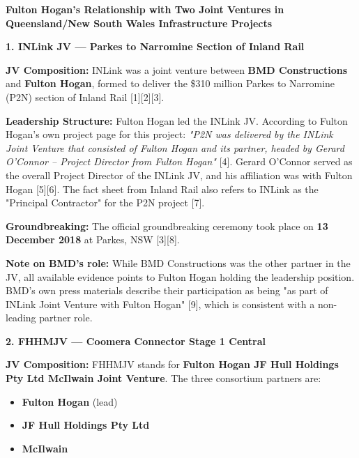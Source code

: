 \documentclass{llmxive}
\begin{document}
\begin{tcolorbox}[breakable,enhanced jigsaw,colback=green!4,colframe=green!55,boxrule=0.4pt,left=5pt,right=5pt,top=3pt,bottom=3pt,fonttitle=\bfseries\sffamily\small,coltitle=black,fontupper=\small,title={Sub-agent report}]
\smallskip\noindent\textbf{Fulton Hogan's Relationship with Two Joint Ventures in Queensland/New South Wales Infrastructure Projects}\par\smallskip

\smallskip\noindent\textbf{1. INLink JV --- Parkes to Narromine Section of Inland Rail}\par\smallskip

\textbf{JV Composition:} INLink was a joint venture between \textbf{BMD Constructions} and \textbf{Fulton Hogan}, formed to deliver the \$310 million Parkes to Narromine (P2N) section of Inland Rail [1][2][3].

\textbf{Leadership Structure:} Fulton Hogan led the INLink JV. According to Fulton Hogan's own project page for this project: \emph{"P2N was delivered by the INLink Joint Venture that consisted of Fulton Hogan and its partner, headed by Gerard O'Connor -- Project Director from Fulton Hogan"} [4]. Gerard O'Connor served as the overall Project Director of the INLink JV, and his affiliation was with Fulton Hogan [5][6]. The fact sheet from Inland Rail also refers to INLink as the "Principal Contractor" for the P2N project [7].

\textbf{Groundbreaking:} The official groundbreaking ceremony took place on \textbf{13 December 2018} at Parkes, NSW [3][8].

\textbf{Note on BMD's role:} While BMD Constructions was the other partner in the JV, all available evidence points to Fulton Hogan holding the leadership position. BMD's own press materials describe their participation as being "as part of INLink Joint Venture with Fulton Hogan" [9], which is consistent with a non-leading partner role.

\smallskip\noindent\textbf{2. FHHMJV --- Coomera Connector Stage 1 Central}\par\smallskip

\textbf{JV Composition:} FHHMJV stands for \textbf{Fulton Hogan JF Hull Holdings Pty Ltd McIlwain Joint Venture}. The three consortium partners are:

\begin{itemize}[leftmargin=1.3em,topsep=2pt,itemsep=1pt,parsep=0pt]
\item \textbf{Fulton Hogan} (lead)
\item \textbf{JF Hull Holdings Pty Ltd}
\item \textbf{McIlwain}
\end{itemize}


\end{tcolorbox}
\end{document}
